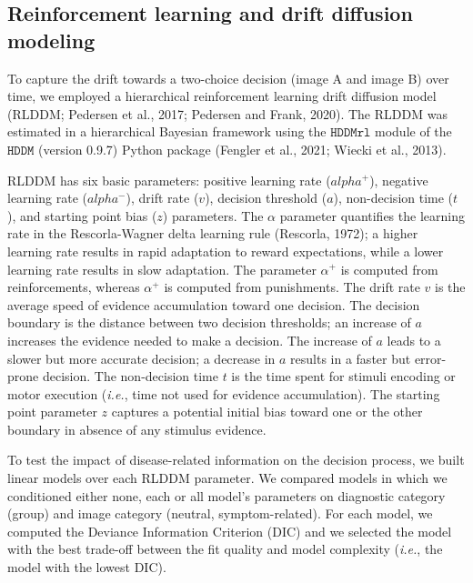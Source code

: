 \documentclass[
  man,floatsintext]{apa6}
\begin{document}
\hypertarget{reinforcement-learning-and-drift-diffusion-modeling}{%
\subsection{Reinforcement learning and drift diffusion modeling}\label{reinforcement-learning-and-drift-diffusion-modeling}}

To capture the drift towards a two-choice decision (image A and image B) over time, we employed a hierarchical reinforcement learning drift diffusion model (RLDDM; Pedersen et al., 2017; Pedersen and Frank, 2020). The RLDDM was estimated in a hierarchical Bayesian framework using the \(\texttt{HDDMrl}\) module of the \(\texttt{HDDM}\) (version 0.9.7) Python package (Fengler et al., 2021; Wiecki et al., 2013).

RLDDM has six basic parameters: positive learning rate (\(alpha^+\)), negative learning rate (\(alpha^-\)), drift rate (\(v\)), decision threshold (\(a\)), non-decision time (\(t\)), and starting point bias (\(z\)) parameters. The \(\alpha\) parameter quantifies the learning rate in the Rescorla-Wagner delta learning rule (Rescorla, 1972); a higher learning rate results in rapid adaptation to reward expectations, while a lower learning rate results in slow adaptation. The parameter \(\alpha^+\) is computed from reinforcements, whereas \(\alpha^+\) is computed from punishments. The drift rate \(v\) is the average speed of evidence accumulation toward one decision. The decision boundary is the distance between two decision thresholds; an increase of \(a\) increases the evidence needed to make a decision. The increase of \(a\) leads to a slower but more accurate decision; a decrease in \(a\) results in a faster but error-prone decision. The non-decision time \(t\) is the time spent for stimuli encoding or motor execution (\emph{i.e.}, time not used for evidence accumulation). The starting point parameter \(z\) captures a potential initial bias toward one or the other boundary in absence of any stimulus evidence.

To test the impact of disease-related information on the decision process, we built linear models over each RLDDM parameter. We compared models in which we conditioned either none, each or all model's parameters on diagnostic category (group) and image category (neutral, symptom-related). For each model, we computed the Deviance Information Criterion (DIC) and we selected the model with the best trade-off between the fit quality and model complexity (\emph{i.e.}, the model with the lowest DIC).
\end{document}
